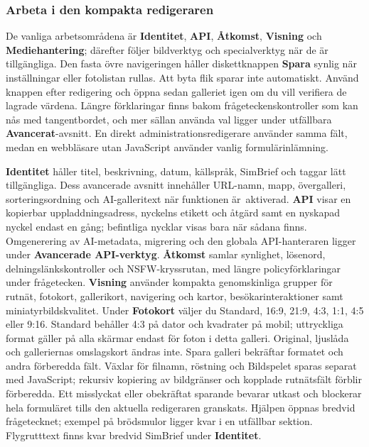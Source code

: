 \documentclass[11pt,a4paper]{article}
\newcommand{\ui}[1]{\textbf{#1}}
\begin{document}
\subsubsection{Arbeta i den kompakta redigeraren}

De vanliga arbetsområdena är \ui{Identitet}, \ui{API}, \ui{Åtkomst},
\ui{Visning} och \ui{Mediehantering}; därefter följer bildverktyg och
specialverktyg när de är tillgängliga. Den fasta övre navigeringen håller
diskettknappen \ui{Spara} synlig när inställningar eller fotolistan rullas. Att
byta flik sparar inte automatiskt. Använd knappen efter redigering och öppna
sedan galleriet igen om du vill verifiera de lagrade värdena. Längre
förklaringar finns bakom frågeteckenskontroller som kan nås med tangentbordet,
och mer sällan använda val ligger under utfällbara \ui{Avancerat}-avsnitt. En
direkt administrationsredigerare använder samma fält, medan en webbläsare utan
JavaScript använder vanlig formulärinlämning.

\ui{Identitet} håller titel, beskrivning, datum, källspråk, SimBrief och taggar
lätt tillgängliga. Dess avancerade avsnitt innehåller URL-namn, mapp,
övergalleri, sorteringsordning och AI-galleritext när funktionen är~aktiverad.
\ui{API} visar en kopierbar uppladdningsadress, nyckelns etikett och åtgärd samt
en nyskapad nyckel endast en gång; befintliga nycklar visas bara när sådana
finns. Omgenerering av AI-metadata, migrering och den globala API-hanteraren
ligger under \ui{Avancerade API-verktyg}. \ui{Åtkomst} samlar synlighet,
lösenord, delningslänkskontroller och NSFW-kryssrutan, med längre
policyförklaringar under frågetecken. \ui{Visning} använder kompakta
genomskinliga grupper för rutnät,
fotokort, gallerikort, navigering och kartor, besökarinteraktioner samt
miniatyrbildskvalitet. Under \ui{Fotokort} väljer du Standard, 16:9, 21:9, 4:3,
1:1, 4:5 eller 9:16. Standard behåller 4:3 på dator och kvadrater på mobil;
uttryckliga format gäller på alla skärmar endast för foton i detta galleri.
Original, ljuslåda och galleriernas omslagskort ändras inte. Spara galleri
bekräftar formatet och andra förberedda fält. Växlar för filnamn, röstning och
Bildspelet sparas separat med JavaScript; rekursiv kopiering av bildgränser och
kopplade rutnätsfält förblir förberedda. Ett misslyckat eller obekräftat
sparande bevarar utkast och blockerar hela formuläret tills den aktuella
redigeraren granskats. Hjälpen öppnas bredvid frågetecknet; exempel på
brödsmulor ligger kvar i en utfällbar sektion.
Flygrutttext finns kvar bredvid SimBrief under \ui{Identitet}.
\end{document}
